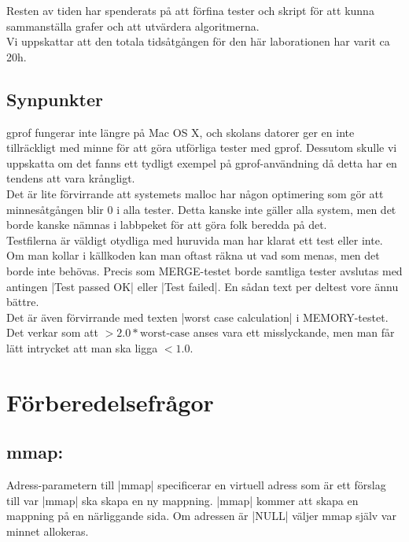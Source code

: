 \documentclass[paper=a4, fontsize=11pt]{scrartcl} %
\numberwithin{equation}{section} %
\numberwithin{figure}{section} %
\numberwithin{table}{section} %
\begin{document}
Resten av tiden har spenderats på att förfina tester och skript för att kunna
sammanställa grafer och att utvärdera algoritmerna.\\

Vi uppskattar att den totala tidsåtgången för den här laborationen har varit
ca 20h.\\


\subsection{Synpunkter}
gprof fungerar inte längre på Mac OS X, och skolans datorer ger en inte
tillräckligt med minne för att göra utförliga tester med gprof.
Dessutom skulle vi uppskatta om det fanns ett tydligt exempel på
gprof-användning då detta har en tendens att vara krångligt.\\

Det är lite förvirrande att systemets malloc har någon optimering som gör att
minnesåtgången blir 0 i alla tester. 
Detta kanske inte gäller alla system, men det borde kanske nämnas i labbpeket
för att göra folk beredda på det.\\

Testfilerna är väldigt otydliga med huruvida man har klarat ett test eller
inte. Om man kollar i källkoden kan man oftast räkna ut vad som menas, men det
borde inte behövas.
Precis som MERGE-testet borde samtliga tester avslutas med antingen
|Test passed OK| eller |Test failed|.
En sådan text per deltest vore ännu bättre.\\

Det är även förvirrande med texten |worst case calculation| i MEMORY-testet.
Det verkar som att $> 2.0*\text{worst-case}$ anses vara ett misslyckande, men
man får lätt intrycket att man ska ligga $< 1.0$.


\section{Förberedelsefrågor}

\subsection*{mmap:}

Adress-parametern till |mmap| specificerar en virtuell adress som är ett
förslag till var |mmap| ska skapa en ny mappning.
|mmap| kommer att skapa en mappning på en närliggande sida.
Om adressen är |NULL| väljer mmap själv var minnet allokeras.\\
\end{document}
